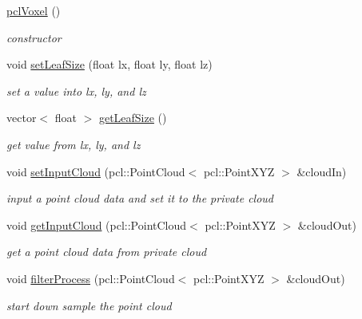 \begin{DoxyCompactItemize}
\item 
\hyperlink{classpclVoxel_a77c4be41d81590d53266dbfe9b39eb70}{pcl\+Voxel} ()\hypertarget{classpclVoxel_a77c4be41d81590d53266dbfe9b39eb70}{}\label{classpclVoxel_a77c4be41d81590d53266dbfe9b39eb70}

\begin{DoxyCompactList}\small\item\em constructor \end{DoxyCompactList}\item 
void \hyperlink{classpclVoxel_a76f7815ad0e25aa4bda048474d9b4c21}{set\+Leaf\+Size} (float lx, float ly, float lz)
\begin{DoxyCompactList}\small\item\em set a value into lx, ly, and lz \end{DoxyCompactList}\item 
vector$<$ float $>$ \hyperlink{classpclVoxel_a1809705dafe6ee554f29e9e74da5f1cf}{get\+Leaf\+Size} ()
\begin{DoxyCompactList}\small\item\em get value from lx, ly, and lz \end{DoxyCompactList}\item 
void \hyperlink{classpclVoxel_aed41ac156f4006ebfa0ffb98ad074461}{set\+Input\+Cloud} (pcl\+::\+Point\+Cloud$<$ pcl\+::\+Point\+X\+YZ $>$ \&cloud\+In)
\begin{DoxyCompactList}\small\item\em input a point cloud data and set it to the private cloud \end{DoxyCompactList}\item 
void \hyperlink{classpclVoxel_a0afe52b2fcb7cfddbe917e07c8f24bb4}{get\+Input\+Cloud} (pcl\+::\+Point\+Cloud$<$ pcl\+::\+Point\+X\+YZ $>$ \&cloud\+Out)
\begin{DoxyCompactList}\small\item\em get a point cloud data from private cloud \end{DoxyCompactList}\item 
void \hyperlink{classpclVoxel_a57b5711e07d1cfb307b8d72766aef447}{filter\+Process} (pcl\+::\+Point\+Cloud$<$ pcl\+::\+Point\+X\+YZ $>$ \&cloud\+Out)
\begin{DoxyCompactList}\small\item\em start down sample the point cloud \end{DoxyCompactList}\end{DoxyCompactItemize}


